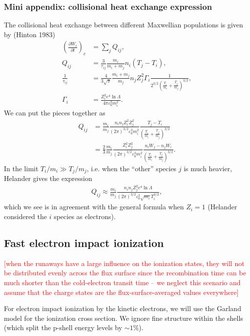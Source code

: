 \documentclass[11pt,a4paper]{article}
\begin{document}
\subsubsection*{Mini appendix: collisional heat exchange expression}
The collisional heat exchange between different Maxwellian populations is given by (Hinton 1983)
\begin{align}
\left(\frac{\partial W_i}{\partial t}\right)_c &= \sum_j Q_{ij}, \nonumber\\
Q_{ij} &= \frac{3}{\tau_{ij}}\frac{m_i}{m_i+m_j}n_i(T_j-T_i), \nonumber\\
\frac{1}{\tau_{ij}} &= \frac{4}{3\sqrt{\pi}}\frac{m_i+m_j}{m_j} n_j Z_j^2\Gamma_i \frac{1}{2^{3/2}\left(\frac{T_i}{m_i}+\frac{T_j}{m_j}\right)^{3/2}}, \nonumber\\
\Gamma_i &= \frac{Z_i^2 e^4 \ln\Lambda}{4\pi\varepsilon_0^2 m_i^2}.
\end{align}
We can put the pieces together as
\begin{align}
Q_{ij} &=\frac{m_i}{m_j} \frac{n_i n_j Z_i^2 Z_j^2}{(2\pi)^{3/2}\varepsilon_0^2 m_i^2}\frac{T_j-T_i}{\left(\frac{T_i}{m_i}+\frac{T_j}{m_j}\right)^{3/2}} \nonumber \\
&= \frac{2}{3}\frac{m_i}{m_j} \frac{Z_i^2 Z_j^2}{(2\pi)^{3/2}\varepsilon_0^2 m_i^2}\frac{n_iW_j-n_jW_i}{\left(\frac{T_i}{m_i}+\frac{T_j}{m_j}\right)^{3/2}}.
\end{align}
In the limit $T_i/m_i \gg T_j/m_j$, i.e. when the ``other'' species $j$ is much heavier, Helander gives the expression
\begin{align}
Q_{ij} \approx \frac{m_i}{m_j}\frac{n_in_j Z_j^2 e^4\ln\Lambda}{(2\pi)^{3/2}\varepsilon_0^2 \sqrt{m_i}T_i^{3/2}},
\end{align}
which we see is in agreement with the general formula when $Z_i=1$ (Helander considered the $i$ species as electrons). 

\subsection{Fast electron impact ionization}
\textcolor{red}{[when the runaways have a large influence on the ionization states, they will not be distributed evenly across the flux surface since the recombination time can be much shorter than the cold-electron transit time -- we neglect this scenario and assume that the charge states are the flux-surface-averaged values everywhere]}

For electron impact ionization by the kinetic electrons, we will use the Garland model for the ionization cross section. We ignore fine structure within the shells (which split the p-shell energy levels by $\sim 1\%$).
\end{document}
